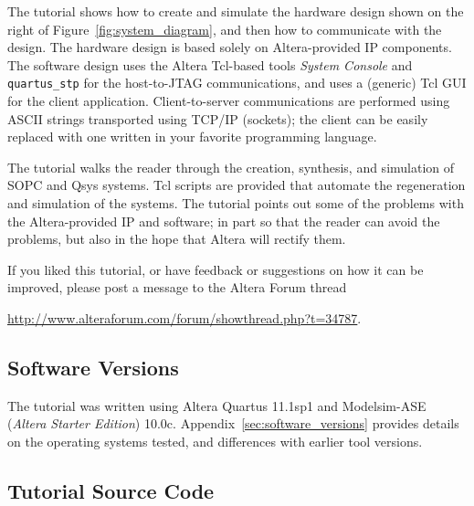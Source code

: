 \documentclass[10pt,twoside]{article}
\begin{document}
The tutorial shows how to create and simulate the hardware
design shown on the right of Figure~\ref{fig:system_diagram},
and then how to communicate with the design. The hardware design 
is based solely on Altera-provided IP components. The software
design uses the Altera Tcl-based tools {\em System Console} and
\verb+quartus_stp+ for the host-to-JTAG communications, and uses 
a (generic) Tcl GUI for the client application. Client-to-server
communications are performed using ASCII strings transported using
TCP/IP (sockets); the client can be easily replaced with one 
written in your favorite programming language.

The tutorial walks the reader through the creation, synthesis,
and simulation of SOPC and Qsys systems. Tcl scripts are provided
that automate the regeneration and simulation of the systems.
The tutorial points out some of the problems with the Altera-provided
IP and software; in part so that the reader can avoid the
problems, but also in the hope that Altera will rectify them.

If you liked this tutorial, or have feedback or suggestions on
how it can be improved, please post a message to the Altera
Forum thread
%
\begin{center}
\url{http://www.alteraforum.com/forum/showthread.php?t=34787}.
\end{center}

\subsection*{Software Versions}

The tutorial was written using Altera Quartus 11.1sp1 and 
Modelsim-ASE ({\em Altera Starter Edition}) 10.0c. 
Appendix~\ref{sec:software_versions} provides details on
the operating systems tested, and differences with
earlier tool versions.

\clearpage
\subsection*{Tutorial Source Code}
\end{document}
